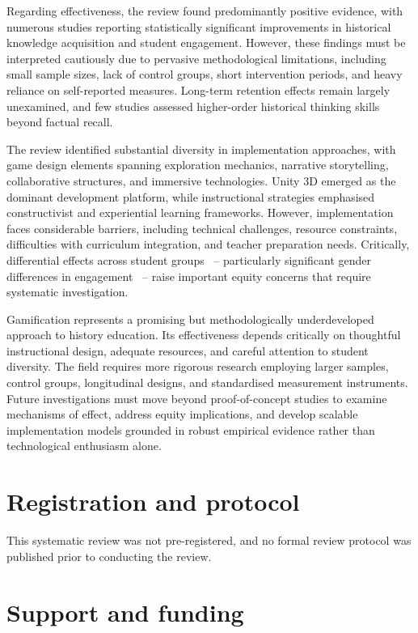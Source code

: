 \documentclass[a4paper,fleqn]{cas-sc}
\begin{document}
Regarding effectiveness, the review found predominantly positive evidence, with numerous studies reporting statistically significant improvements in historical knowledge acquisition and student engagement. However, these findings must be interpreted cautiously due to pervasive methodological limitations, including small sample sizes, lack of control groups, short intervention periods, and heavy reliance on self-reported measures. Long-term retention effects remain largely unexamined, and few studies assessed higher-order historical thinking skills beyond factual recall.

The review identified substantial diversity in implementation approaches, with game design elements spanning exploration mechanics, narrative storytelling, collaborative structures, and immersive technologies. Unity 3D emerged as the dominant development platform, while instructional strategies emphasised constructivist and experiential learning frameworks. However, implementation faces considerable barriers, including technical challenges, resource constraints, difficulties with curriculum integration, and teacher preparation needs. Critically, differential effects across student groups ~--  particularly significant gender differences in engagement ~--  raise important equity concerns that require systematic investigation.

Gamification represents a promising but methodologically underdeveloped approach to history education. Its effectiveness depends critically on thoughtful instructional design, adequate resources, and careful attention to student diversity. The field requires more rigorous research employing larger samples, control groups, longitudinal designs, and standardised measurement instruments. Future investigations must move beyond proof-of-concept studies to examine mechanisms of effect, address equity implications, and develop scalable implementation models grounded in robust empirical evidence rather than technological enthusiasm alone.

	\printcredits


\section*{Registration and protocol}

This systematic review was not pre-registered, and no formal review protocol was published prior to conducting the review.

\section*{Support and funding}
\end{document}
